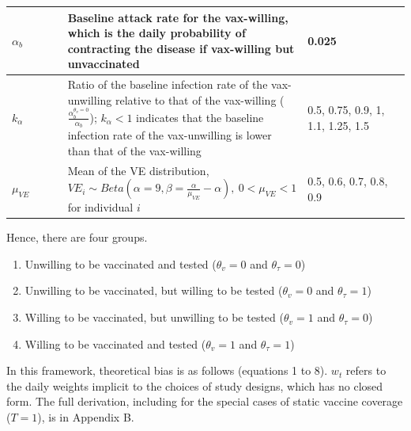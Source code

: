 \documentclass[12pt]{article}
\begin{document}
\begin{table}[H]
\begin{center}
\begin{tabular}{||p{0.15\linewidth}| p{0.57\linewidth}|p{0.28\linewidth}||}
			\hline 
			$\alpha_{b}$ & Baseline attack rate for the vax-willing, which is the daily probability of contracting the disease if vax-willing but unvaccinated & 0.025 \\
			\hline 
			$k_\alpha$ & Ratio of the baseline infection rate of the vax-unwilling relative to that of the vax-willing ($\frac{\alpha_{b}^{\theta_{v}=0}}{\alpha_{b}}$); $k_\alpha < 1$ indicates that the baseline infection rate of the vax-unwilling is lower than that of the vax-willing & 0.5, 0.75, 0.9, 1, 1.1, 1.25, 1.5 \\
			\hline 
			$\mu_{VE}$ & Mean of the VE distribution, ${VE}_{i} \sim Beta(\alpha=9,\beta=\frac{\alpha}{\mu_{VE}} - \alpha), \ 0 < \mu_{VE} < 1$ for individual $i$ & 0.5, 0.6, 0.7, 0.8, 0.9 \\
			\hline \hline
		\end{tabular}
	\end{center}
\end{table}

Hence, there are four groups.
\begin{enumerate}
	\item Unwilling to be vaccinated and tested ($\theta_{v} = 0$ and $\theta_{\tau} = 0$)
	\item Unwilling to be vaccinated, but willing to be tested ($\theta_{v} = 0$ and $\theta_{\tau} = 1$)
	\item Willing to be vaccinated, but unwilling to be tested ($\theta_{v} = 1$ and $\theta_{\tau} = 0$)
	\item Willing to be vaccinated and tested ($\theta_{v} = 1$ and $\theta_{\tau} = 1$)
\end{enumerate}

In this framework, theoretical bias is as follows (equations 1 to 8). $w_t$ refers to the daily weights implicit to the choices of study designs, which has no closed form. The full derivation, including for the special cases of static vaccine coverage ($T=1$), is in Appendix B.
\end{document}
